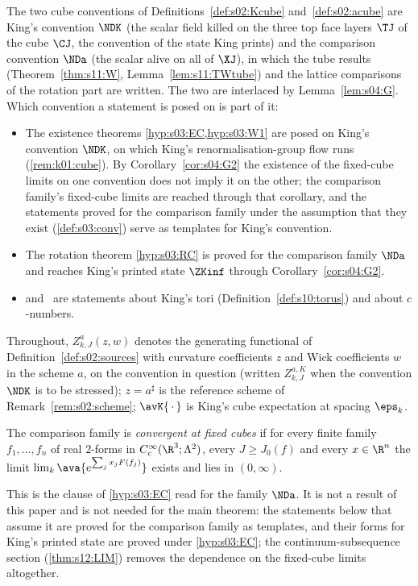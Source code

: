 The two cube conventions of Definitions~\ref{def:s02:Kcube} and~\ref{def:s02:acube} are King's convention $\NDK$ (the scalar field killed on the three top face layers $\TJ$ of the cube $\CJ$, the convention of the state King prints) and the comparison convention $\NDa$ (the scalar alive on all of $\XJ$), in which the tube results (Theorem~\ref{thm:s11:W}, Lemma~\ref{lem:s11:TWtube}) and the lattice comparisons of the rotation part are written. The two are interlaced by Lemma~\ref{lem:s04:G}. Which convention a statement is posed on is part of it:
\begin{itemize}[leftmargin=2em]
\item The existence theorems \cref{hyp:s03:EC,hyp:s03:W1} are posed on King's convention $\NDK$, on which King's renormalisation-group flow runs (\cref{rem:k01:cube}). By Corollary~\ref{cor:s04:G2} the existence of the fixed-cube limits on one convention does not imply it on the other; the comparison family's fixed-cube limits are reached through that corollary, and the statements proved for the comparison family under the assumption that they exist (\cref{def:s03:conv}) serve as templates for King's convention.
\item The rotation theorem \cref{hyp:s03:RC} is proved for the comparison family $\NDa$ and reaches King's printed state $\ZKinf$ through Corollary~\ref{cor:s04:G2}.
\item {} and \Tthree\ are statements about King's tori (Definition~\ref{def:s10:torus}) and about $c$-numbers.
\end{itemize}
Throughout, $Z^{a}_{k,J}(z,w)$ denotes the generating functional of Definition~\ref{def:s02:sources} with curvature coefficients $z$ and Wick coefficients $w$ in the scheme $a$, on the convention in question (written $Z^{a,K}_{k,J}$ when the convention $\NDK$ is to be stressed); $z=a^\sharp$ is the reference scheme of Remark~\ref{rem:s02:scheme}; $\avK{\,\cdot\,}$ is King's cube expectation at spacing $\eps_k$.

\begin{definition}\label{def:s03:conv}
The comparison family is \emph{convergent at fixed cubes} if for every finite family $f_1,\dots,f_n$ of real $2$-forms in $C^\infty_c(\R^3;\Lambda^2)$, every $J\ge J_0(f)$ and every $x\in\R^n$ the limit $\lim_k\ava{e^{\sum_jx_jF(f_j)}}$ exists and lies in $(0,\infty)$.
\end{definition}
This is the clause of \cref{hyp:s03:EC} read for the family $\NDa$. It is not a result of this paper and is not needed for the main theorem: the statements below that assume it are proved for the comparison family as templates, and their forms for King's printed state are proved under \cref{hyp:s03:EC}; the continuum-subsequence section (\cref{thm:s12:LIM}) removes the dependence on the fixed-cube limits altogether.

